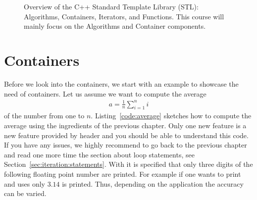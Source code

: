 \begin{figure}[tb]
    \centering
    \caption{Overview of the C++ Standard Template Library (STL): Algorithms, Containers, Iterators, and Functions. This course will mainly focus on the Algorithms and Container components.}
    \label{fig:stl:components}
\end{figure}

\section{Containers}
\label{sec:containers}
Before we look into the containers, we start with an example to showcase the need of containers. Let us assume we want to compute the average
\begin{align}
a = \frac{1}{n}\sum\limits_{i=1}^n i
\end{align}
of the number from one to $n$. Listing~\ref{code:average} sketches how to compute the average using the ingredients of the previous chapter. Only one new feature  is a new feature provided by  header and you should be able to understand this code. If you have any issues, we highly recommend to go back to the previous chapter and read one more time the section about loop statements, see Section~\ref{sec:iteration:statements}. With  it is specified that only three digits of the following floating point number are printed. For example if one wants to print  and uses  only $3.14$ is printed. Thus, depending on the application the accuracy can be varied.\\

